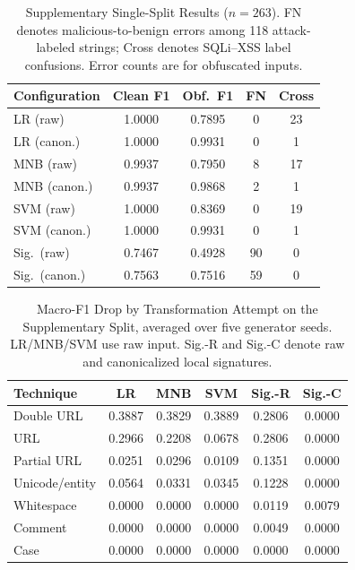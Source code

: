 \begin{table}[htbp]
\caption{Supplementary Single-Split Results ($n=263$).
  FN denotes malicious-to-benign errors among 118 attack-labeled strings;
  Cross denotes SQLi--XSS label confusions.
  Error counts are for obfuscated inputs.}
\label{tab:single}
\begin{center}
\setlength{\tabcolsep}{3pt}\footnotesize
\begin{tabular}{|l|c|c|c|c|}
\hline
\textbf{Configuration} & \textbf{Clean F1} & \textbf{Obf.\ F1} & \textbf{FN} & \textbf{Cross} \\
\hline
LR (raw)          & 1.0000 & 0.7895 &  0 & 23 \\
\hline
LR (canon.)       & 1.0000 & 0.9931 &  0 &  1 \\
\hline
MNB (raw)         & 0.9937 & 0.7950 &  8 & 17 \\
\hline
MNB (canon.)      & 0.9937 & 0.9868 &  2 &  1 \\
\hline
SVM (raw)         & 1.0000 & 0.8369 &  0 & 19 \\
\hline
SVM (canon.)      & 1.0000 & 0.9931 &  0 &  1 \\
\hline
Sig.\ (raw)       & 0.7467 & 0.4928 & 90 &  0 \\
\hline
Sig.\ (canon.)    & 0.7563 & 0.7516 & 59 &  0 \\
\hline
\end{tabular}
\end{center}
\end{table}

\begin{table}[htbp]
\caption{Macro-F1 Drop by Transformation Attempt on the Supplementary
Split, averaged over five generator seeds.
LR/MNB/SVM use raw input.
Sig.-R and Sig.-C denote raw and canonicalized local signatures.}
\label{tab:technique}
\begin{center}
\setlength{\tabcolsep}{3pt}\footnotesize
\begin{tabular}{|l|c|c|c|c|c|}
\hline
\textbf{Technique}&\textbf{LR}&\textbf{MNB}&\textbf{SVM}&\textbf{Sig.-R}&\textbf{Sig.-C}\\
\hline
Double URL   & 0.3887 & 0.3829 & 0.3889 & 0.2806 & 0.0000 \\
\hline
URL          & 0.2966 & 0.2208 & 0.0678 & 0.2806 & 0.0000 \\
\hline
Partial URL  & 0.0251 & 0.0296 & 0.0109 & 0.1351 & 0.0000 \\
\hline
Unicode/entity & 0.0564 & 0.0331 & 0.0345 & 0.1228 & 0.0000 \\
\hline
Whitespace   & 0.0000 & 0.0000 & 0.0000 & 0.0119 & 0.0079 \\
\hline
Comment      & 0.0000 & 0.0000 & 0.0000 & 0.0049 & 0.0000 \\
\hline
Case         & 0.0000 & 0.0000 & 0.0000 & 0.0000 & 0.0000 \\
\hline
\end{tabular}
\end{center}
\end{table}

